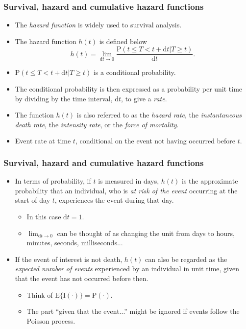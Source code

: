 \documentclass[10pt]{beamer}\usepackage[]{graphicx}\usepackage[]{color}
\newcommand{\dt}{\mathrm{d}t}
\newcommand{\empr}[1]{{\emph{\color{red}#1}}}
\newcommand{\E}{\mathrm{E}}
\newcommand{\I}{\mathrm{I}}
\newcommand{\p}{\mathrm{P}}
\begin{document}
\begin{frame}
  \frametitle{Survival, hazard and cumulative hazard functions}
  \begin{itemize}
    \item The \empr{hazard function} is widely used to survival analysis. 
    \item The hazard function $h(t)$ is defined below
      \begin{equation}
        h(t) = \lim_{\dt\to0}\frac{\p(t\le T < t + \dt|T\ge t)}{\dt}.
        \label{eq:haz}
      \end{equation}
    \item $\p(t\le T< t + \dt|T\ge t)$ is a conditional probability.
    \item The conditional probability is then expressed as a probability per unit time by dividing by the time interval, $\dt$, to give a \empr{rate}.
    \item The function $h(t)$ is also referred to as the \empr{hazard rate}, the \empr{instantaneous death rate}, 
      the \empr{intensity rate}, or the \empr{force of mortality}.
    \item Event rate at time $t$, conditional on the event not having occurred before $t$.
    \end{itemize}
\end{frame}

\begin{frame}
  \frametitle{Survival, hazard and cumulative hazard functions}
  \begin{itemize}
    \item In terms of probability, if $t$ is measured in days, $h(t)$ is the approximate probability that an individual, 
      who is \empr{at risk of the event} occurring at the start of day $t$, experiences the event during that day.
      \begin{itemize}
      \item In this case $\dt = 1$.
      \item $\lim_{\dt \to0}$ can be thought of as changing the unit from days to hours, minutes, seconds, milliseconds...
      \end{itemize}
    \item If the event of interest is not death, $h(t)$ can also be regarded as the \empr{expected number of events}
      experienced by an individual in unit time, given that the event has not occurred before then. 
      \begin{itemize}
        \item Think of $\E\{\I(\cdot)\} = \p(\cdot)$.
        \item The part ``given that the event...'' might be ignored if events follow the Poisson process.
        \end{itemize}
      \end{itemize}
\end{frame}
\end{document}
